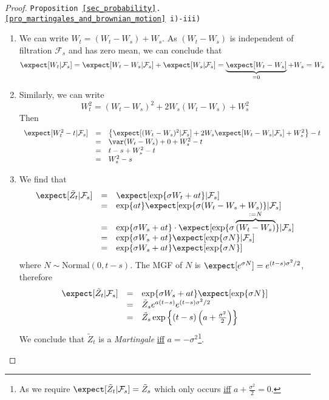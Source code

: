 \documentclass[11pt,a4paper]{article}
\begin{document}
  \begin{proof}{\texttt{Proposition \ref{sec_probability}.\ref{pro_martingales_and_brownian_motion} i)-iii)}}
    \begin{enumerate}
      \item We can write $W_t=(W_t-W_s)+W_s$. As $(W_t-W_s)$ is independent of filtration $\mathcal{F}_s$ and has zero mean, we can conclude that
      \[ \expect[W_t|\mathcal{F}_s]=\expect[W_t-W_s|\mathcal{F}_s]+\expect[W_s|\mathcal{F}_s]=\underbrace{\expect[W_t-W_s]}_{=0}+W_s=W_s \]
      \item Similarly, we can write
      \[ W_t^2=(W_t-W_s)^2+2W_s(W_t-W_s)+W_s^2 \]
      Then
      \[\begin{array}{rcl}
        \expect[W_t^2-t|\mathcal{F}_s]&=&\left\{\expect[(W_t-W_s)^2|\mathcal{F}_s]+2W_s\expect[W_t-W_s|\mathcal{F}_s]+W_s^2\right\}-t\\
        &=&\var(W_t-W_s)+0+W_s^2-t\\
        &=&t-s+W_s^2-t\\
        &=&W_s^2-s
      \end{array}\]
      \item We find that
      \[\begin{array}{rcl}
        \expect[\tilde{Z}_t|\mathcal{F}_s]&=&\expect[\exp\{\sigma W_t+at\}|\mathcal{F}_s]\\
        &=&\exp\{at\}\expect[\exp\{\sigma(W_t-W_s+W_s)\}|\mathcal{F}_s]\\
        &=&\exp\{\sigma W_s+at\}\cdot\expect[\exp\{\sigma\overbrace{(W_t-W_s)}^{:=N}\}|\mathcal{F}_s]\\
        &=&\exp\{\sigma W_s+at\}\expect[\exp\{\sigma N\}|\mathcal{F}_s]\\
        &=&\exp\{\sigma W_s+at\}\expect[\exp\{\sigma N\}]
      \end{array}\]
      where $N\sim\text{Normal}(0,t-s)$. The MGF of $N$ is $\expect[e^{\sigma N}]=e^{(t-s)\sigma^2/2}$, therefore
      \[\begin{array}{rcl}
        \expect[\tilde{Z}_t|\mathcal{F}_s]&=&\exp\{\sigma W_s+at\}\expect[\exp\{\sigma N\}]\\
        &=&\tilde{Z}_se^{a(t-s)}e^{(t-s)\sigma^2/2}\\
        &=&\tilde{Z}_s\exp\left\{(t-s)\left(a+\frac{\sigma^2}2\right)\right\}
      \end{array}\]
      We conclude that $\tilde{Z}_t$ is a \textit{Martingale} \underline{iff} $a=-\sigma^2$\footnote{As we require $\expect[\tilde{Z}_t|\mathcal{F}_s]=\tilde{Z}_s$ which only occurs \underline{iff} $a+\frac{\sigma^2}2=0$.}.
    \end{enumerate}
    \proved
  \end{proof}
\end{document}
